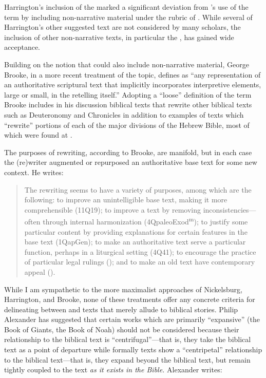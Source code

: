 Harrington's inclusion of the \templescroll marked a
significant deviation from \vermes's use of the term by
including non-narrative material under the rubric of
\rwb. While several of Harrington's other suggested text
are not considered \rwb by many scholars, the inclusion
of other non-narrative texts, in particular the
\templescroll, has gained wide
acceptance.\autocite{bernstein_textus2005}

Building on the notion that \rwb could also include
non-narrative material, George Brooke, in a more recent treatment of the
topic, defines \rwb as ``any representation of an
authoritative scriptural text that implicitly incorporates interpretive
elements, large or small, in the retelling
itself.''\autocite[777]{brooke_schiffman-vanderkam2000} Adopting a
``loose'' definition of the term Brooke includes in his discussion
biblical texts that rewrite other biblical texts such as Deuteronomy and
Chronicles in addition to examples of texts which ``rewrite'' portions
of each of the major divisions of the Hebrew Bible, most of which were
found at \qumran.\autocites[Brooke categorizes the texts
as follows: Reworked Pentateuchs, Rewritten Pentateuchal narratives,
Rewritten Pentateuchal laws, Rewritten Former Prophets, Rewritten Latter
Prophets, and Rewritten
Writings.][778--780]{brooke_schiffman-vanderkam2000}[See
also][]{brooke_herbert-tov2002}

The purposes of rewriting, according to Brooke, are manifold, but in
each case the (re)writer augmented or repurposed an authoritative base
text for some new context. He writes:

\begin{quote}
The rewriting seems to have a variety of purposes, among which are the
following: to improve an unintelligible base text, making it more
comprehensible (11Q19); to improve a text by removing
inconsistencies---often through internal harmonization
(4QpaleoExod\textsuperscript{m}); to justify some particular content by
providing explanations for certain features in the base text (1QapGen);
to make an authoritative text serve a particular function, perhaps in a
liturgical setting (4Q41); to encourage the practice of particular legal
rulings (\jub); and to make an old text have
contemporary appeal
(\templescroll).\autocite[778]{brooke_schiffman-vanderkam2000}
\end{quote}

While I am sympathetic to the more maximalist approaches of Nickelsburg,
Harrington, and Brooke, none of these treatments offer any concrete
criteria for delineating between \rwb and texts that
merely allude to biblical stories. Philip Alexander has suggested that
certain works which are primarily ``expansive'' (the Book of Giants, the
Book of Noah) should not be considered \rwb because
their relationship to the biblical text is ``centrifugal''---that is,
they take the biblical text as a point of departure while formally
\rwb texts show a ``centripetal'' relationship to the
biblical text---that is, they expand beyond the biblical text, but
remain tightly coupled to the text \emph{as it exists in the Bible.}
Alexander writes:

